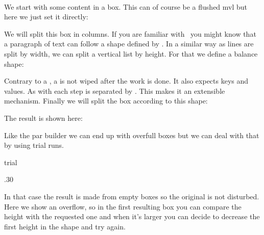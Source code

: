 \startbuffer[three]
\setbox\scratchboxtwo\vbalance\scratchboxone
\stopbuffer

\startbuffer[four]
\hbox \bgroup
    \localcontrolledendless {%
        \ifvoid\scratchboxtwo
            \expandafter\quitloop
        \else
            \setbox\scratchbox\ruledhbox\bgroup
                \vbalancedbox\scratchboxtwo
            \egroup
            \vbox to 12\lineheight \bgroup
                \box\scratchbox
                \vfill
            \egroup
            \hskip1em
        \fi
    }\unskip
\egroup
\stopbuffer

We start with some content in a box. This can of course be a flushed
mvl but here we just set it directly:

\typebuffer[one]

We will split this box in columns. If you are familiar with \TEX\ you might know
that a paragraph of text can follow a shape defined by \type {\parshape}. In a
similar way as lines are split by width, we can split a vertical list by height.
For that we define a balance shape:

\typebuffer[two]

\typebuffer[three]

Contrary to a \type {\parshape}, a \type {\balanceshape} is not wiped after the
work is done. It also expects keys and values. As with \type {\parpasses} each
step is separated by . This makes it an extensible mechanism. Finally
we will split the box according to this shape:

\typebuffer[four]

The result is shown here:

\startlinecorrection
    \small
\stoplinecorrection

Like the par builder we can end up with overfull boxes but we can deal with that
by using trial runs.

\starttyping
\setbox\scratchboxtwo\vbalance\scratchboxone trial
\stoptyping

\startbuffer[one]
\setbox\scratchboxone\vbox\bgroup
    \hsize.30\hsize
     \blank
     \blank
\egroup
\stopbuffer

In that case the result is made from empty boxes so the original is not
disturbed. Here we show an overflow, so in the first resulting box you
can compare the height with the requested one and when it's larger you
can decide to decrease the first height in the shape and try again.

